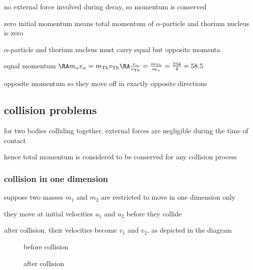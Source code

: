 \sol no external force involved during decay, so momentum is conserved

zero initial momentum means total momentum of $\alpha$-particle and thorium nucleus is zero

$\alpha$-particle and thorium nucleus must carry equal but opposite momenta

equal momentum $\RA m_\alpha v_\alpha = m_\text{Th} v_\text{Th} \RA \frac{v_\alpha}{v_\text{Th}} = \frac{m_\text{Th}}{m_\alpha} = \frac{234}{4}=58.5 $

opposite momentum so they move off in exactly opposite directions \eoe



\subsection{collision problems}


for two bodies colliding together, external forces are negligible during the time of contact

hence total momentum is considered to be conserved for any collision process

\subsubsection{collision in one dimension}

suppose two masses $m_1$ and $m_2$ are restricted to move in one dimension only

they move at initial velocities $u_1$ and $u_2$ before they collide

after collision, their velocities become $v_1$ and $v_2$, as depicted in the diagram

\begin{figure}[!ht]
\centering
\begin{minipage}{0.45\textwidth}
	\begin{center}
		
		before collision
	\end{center}
\end{minipage}\hfil
\begin{minipage}{0.45\textwidth}
	\begin{center}
		
		after collision
	\end{center}
\end{minipage}
\end{figure}

